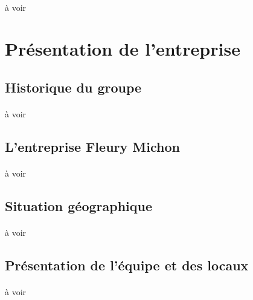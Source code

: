 \documentclass[a4paper,12pt]{extarticle}
\begin{document}
\paragraph{}
à voir\\

\clearpage

\section{Présentation de l’entreprise}

\subsection{Historique du groupe}

\paragraph{}
à voir\\

\subsection{L’entreprise Fleury Michon}

\paragraph{}
à voir\\

\begin{center}
\end{center}

\subsection{Situation géographique}

\paragraph{}
à voir\\

\subsection{Présentation de l'équipe et des locaux}

\paragraph{}
à voir\\
\end{document}
